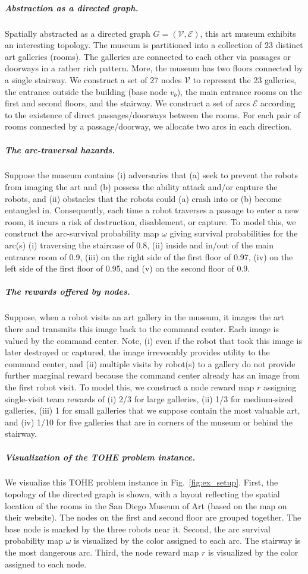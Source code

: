 \documentclass[11pt, oneside]{article}
\begin{document}
\subparagraph{Abstraction as a directed graph.} Spatially abstracted as a directed graph $G=(\mathcal{V}, \mathcal{E})$, this art museum exhibits an interesting topology. 
The museum is partitioned into a collection of 23 distinct art galleries (rooms). The galleries are connected to each other via passages or doorways in a rather rich pattern.
More, the museum has two floors connected by a single stairway.
We construct a set of 27 nodes $\mathcal{V}$ to represent the 23 galleries, the entrance outside the building (base node $v_b$), the main entrance rooms on the first and second floors, and the stairway.
We construct a set of arcs $\mathcal{E}$ according to the existence of direct passages/doorways between the rooms. For each pair of rooms connected by a passage/doorway, we allocate two arcs in each direction. 

\subparagraph{The arc-traversal hazards.}
Suppose the museum contains
(i) adversaries that (a) seek to prevent the robots from imaging the art and (b) possess the ability attack and/or capture the robots, and
(ii) obstacles that the robots could (a) crash into or (b) become entangled in.
Consequently, each time a robot traverses a passage to enter a new room, it incurs a risk of destruction, disablement, or capture. 
To model this, we construct the arc-survival probability map $\omega$ giving survival probabilities for the arc(s)
(i) traversing the staircase of 0.8,
(ii) inside and in/out of the main entrance room of 0.9,
(iii) on the right side of the first floor of 0.97,
(iv) on the left side of the first floor of 0.95,
and
(v) on the second floor of 0.9.

\subparagraph{The rewards offered by nodes.}
Suppose, when a robot visits an art gallery in the museum, it images the art there and transmits this image back to the command center. 
Each image is valued by the command center.
Note, (i) even if the robot that took this image is later destroyed or captured, the image irrevocably provides utility to the command center, and (ii) multiple visits by robot(s) to a gallery do not provide further marginal reward because the command center already has an image from the first robot visit.
To model this, we construct a node reward map $r$ assigning single-visit team rewards of
(i) 2/3 for large galleries,
(ii) 1/3 for medium-sized galleries,
(iii) 1 for small galleries that we suppose contain the most valuable art, and
(iv) 1/10 for five galleries that are in corners of the museum or behind the stairway.  

\subparagraph{Visualization of the TOHE problem instance.}
We visualize this TOHE problem instance in Fig.~\ref{fig:ex_setup}. 
First, the topology of the directed graph is shown, with a layout reflecting the spatial location of the rooms in the San Diego Museum of Art (based on the map on their website). The nodes on the first and second floor are grouped together.
The base node is marked by the three robots near it.
Second, the arc survival probability map $\omega$ is visualized by the color assigned to each arc.
The stairway is the most dangerous arc.
Third, the node reward map $r$ is visualized by the color assigned to each node. 
\end{document}

